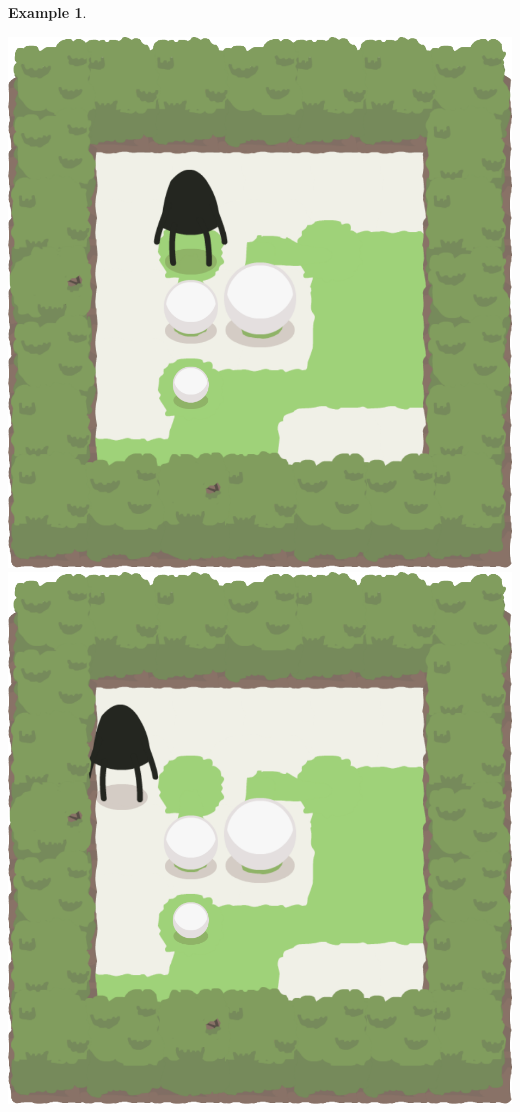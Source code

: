 \documentclass{report}
\theoremstyle{plain}
\newtheorem{example}{Example}[section]
\begin{document}
\begin{example}
\begin{center}
\includegraphics[width=\andyWidth\textwidth]{andy-basic-11.png} \quad
\includegraphics[width=\andyWidth\textwidth]{andy-basic-12.png}

\end{center}
\end{example}
\end{document}

